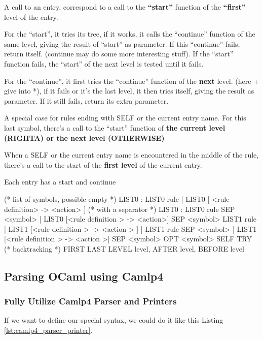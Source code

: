 \begin{enumerate}[(I)]
  A call to an entry, correspond to a call to the \textbf{``start''} function of
  the \textbf{``first''} level of the entry.

  For the ``start'', it tries its tree, if it works, it calls the
  ``continue'' function of the same level, giving the result of ``start''
  as parameter. If this ``continue'' fails, return itself. (continue may
  do some more interesting stuff). If the ``start'' function fails, the
  ``start'' of the next level is tested until it fails. 


  For the ``continue'', it first tries the ``continue'' function of the
  \textbf{next} level. (here + give into *), if it fails or it's the
  last level, it then tries itself, giving the result as parameter. If
  it still fails, return its extra parameter.

  A special case for rules ending with SELF or the current entry
  name. For this last symbol, there's a call to the ``start'' function
  of \textbf{the current level (RIGHTA) or the next level (OTHERWISE)}

  When a SELF or the current entry name is encountered in the middle
  of the rule, there's a call to the start of the \textbf{first level} of the
  current entry.

  Each entry has a start and continue

\begin{ocamlcode}
(* list of symbols, possible empty *)
LIST0 : LIST0 rule | LIST0 [ <rule definition> -> <action> ]
(* with a separator *)
LIST0 : LIST0 rule SEP <symbol>
| LIST0 [<rule definition > -> <action>] SEP <symbol>
  LIST1 rule
| LIST1 [<rule definition > -> <action > ]
| LIST1 rule SEP <symbol>
| LIST1 [<rule definition > -> <action >] SEP <symbol>
OPT <symbol>
SELF
TRY (* backtracking *)
FIRST LAST LEVEL level, AFTER level, BEFORE level 
\end{ocamlcode}
\end{enumerate}

\subsection{Parsing OCaml using Camlp4}

\subsubsection{Fully Utilize Camlp4 Parser and Printers}
If we want to define our special syntax, we could do it like this
Listing \ref{lst:camlp4_parser_printer}.

